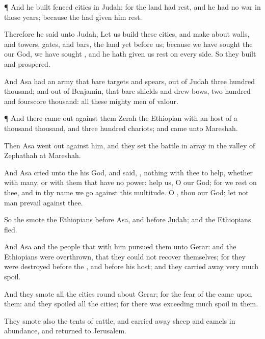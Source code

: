 {\par }{\PP {}¶ And he
built
fenced
cities in
Judah: for the
land had
rest, and he had no
war in those
years; because the
{} had given him
rest.

Therefore he
said unto
Judah, Let us
build these
cities, and make
about
{}
walls, and
towers,
gates, and
bars,
{} the
land
{} yet
before us; because we have
sought the
{} our
God, we have
sought
{}, and he hath given us
rest on every
side. So they
built and
prospered.

And
Asa had an
army
{} that
bare
targets and
spears, out of
Judah
three
hundred
thousand; and out of
Benjamin, that
bare
shields and
drew
bows, two
hundred and
fourscore
thousand: all these
{} mighty
men of
valour.


\par }{\PP {}¶ And there came
out against them
Zerah the
Ethiopian with an
host of a
thousand
thousand, and
three
hundred
chariots; and
came unto
Mareshah.

Then
Asa went
out
against him, and they set the
battle in
array in the
valley of
Zephathah at
Mareshah.

And
Asa
cried unto the
{} his
God, and
said,
{},
{} nothing with thee to
help,
whether with
many, or with them that have no
power:
help us, O
{} our
God; for we
rest on thee, and in thy
name we
go against this
multitude. O
{}, thou
{} our
God; let not
man
prevail against thee.

So the
{}
smote the
Ethiopians
before
Asa, and
before
Judah; and the
Ethiopians
fled.

And
Asa and the
people that
{} with him
pursued them unto
Gerar: and the
Ethiopians were
overthrown, that they could not
recover themselves; for they were
destroyed
before the
{}, and
before his
host; and they carried
away
very
much
spoil.

And they
smote all the
cities round
about
Gerar; for the
fear of the
{} came upon them: and they
spoiled all the
cities; for there was exceeding
much
spoil in them.

They
smote also the
tents of
cattle, and carried
away
sheep and
camels in
abundance, and
returned to
Jerusalem.




}
